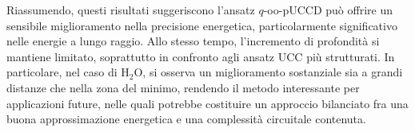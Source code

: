 Riassumendo, questi risultati suggeriscono l'ansatz $q$-oo-pUCCD può offrire un sensibile miglioramento nella precisione energetica, particolarmente significativo nelle energie a lungo raggio. Allo stesso tempo, l’incremento di profondità si mantiene limitato, soprattutto in confronto agli ansatz UCC più strutturati. In particolare, nel caso di H$_2$O, si osserva un miglioramento sostanziale sia a grandi distanze che nella zona del minimo, rendendo il metodo interessante per applicazioni future, nelle quali potrebbe costituire un approccio bilanciato fra una buona approssimazione energetica e una complessità circuitale contenuta.